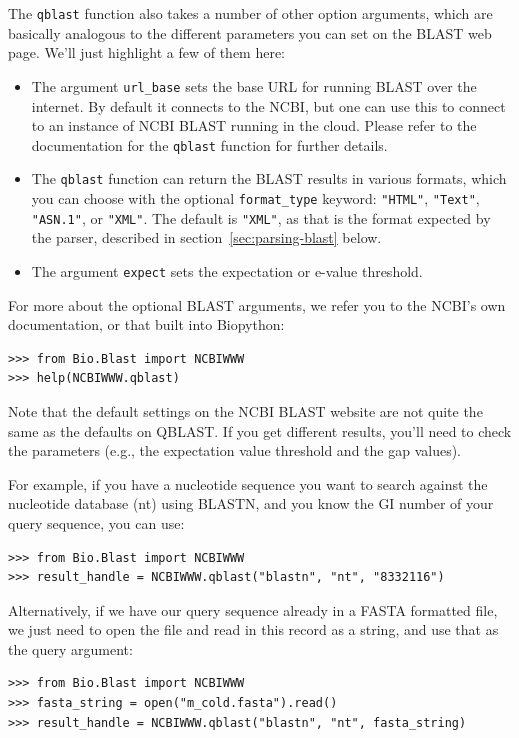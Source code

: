 The \verb|qblast| function also takes a number of other option arguments,
which are basically analogous to the different parameters you can set
on the BLAST web page.  We'll just highlight a few of them here:

\begin{itemize}
\item The argument \verb|url_base| sets the base URL for running BLAST over the
internet. By default it connects to the NCBI, but one can use this to connect
to an instance of NCBI BLAST running in the cloud. Please refer to the documentation
for the \verb|qblast| function for further details.
\item The \verb|qblast| function can return the BLAST results in various
formats, which you can choose with the optional \verb|format_type| keyword:
\verb|"HTML"|, \verb|"Text"|, \verb|"ASN.1"|, or \verb|"XML"|.
The default is \verb|"XML"|, as that is the format expected by the parser,
described in section~\ref{sec:parsing-blast} below.
\item The argument \verb|expect| sets the expectation or e-value threshold.
\end{itemize}

For more about the optional BLAST arguments, we refer you to the NCBI's own
documentation, or that built into Biopython:

\begin{verbatim}
>>> from Bio.Blast import NCBIWWW
>>> help(NCBIWWW.qblast)
\end{verbatim}

Note that the default settings on the NCBI BLAST website are not quite
the same as the defaults on QBLAST. If you get different results, you'll
need to check the parameters (e.g., the expectation value threshold and
the gap values).

For example, if you have a nucleotide sequence you want to search against
the nucleotide database (nt) using BLASTN, and you know the GI number of your
query sequence, you can use:

\begin{verbatim}
>>> from Bio.Blast import NCBIWWW
>>> result_handle = NCBIWWW.qblast("blastn", "nt", "8332116")
\end{verbatim}

Alternatively, if we have our query sequence already in a FASTA formatted
file, we just need to open the file and read in this record as a string,
and use that as the query argument:

\begin{verbatim}
>>> from Bio.Blast import NCBIWWW
>>> fasta_string = open("m_cold.fasta").read()
>>> result_handle = NCBIWWW.qblast("blastn", "nt", fasta_string)
\end{verbatim}

